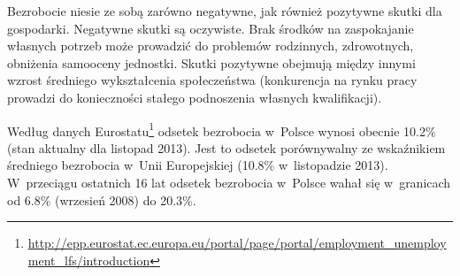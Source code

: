 \documentclass[12pt]{article}
\begin{document}
    Bezrobocie niesie ze sobą zarówno negatywne, jak również pozytywne skutki dla gospodarki. Negatywne skutki są oczywiste. Brak środków na zaspokajanie własnych potrzeb może prowadzić do problemów rodzinnych, zdrowotnych, obniżenia samooceny jednostki. Skutki pozytywne obejmują między innymi wzrost średniego wykształcenia społeczeństwa (konkurencja na rynku pracy prowadzi do konieczności stałego podnoszenia własnych kwalifikacji).
    
    Według danych Eurostatu\footnote{\url{http://epp.eurostat.ec.europa.eu/portal/page/portal/employment_unemployment_lfs/introduction}} odsetek bezrobocia w~Polsce wynosi obecnie 10.2\% (stan aktualny dla listopad 2013). Jest to odsetek porównywalny ze wskaźnikiem średniego bezrobocia w~Unii Europejskiej (10.8\% w~listopadzie 2013). W~przeciągu ostatnich 16 lat odsetek bezrobocia w~Polsce wahał się w~granicach od 6.8\% (wrzesień 2008) do 20.3\%. 
\end{document}
